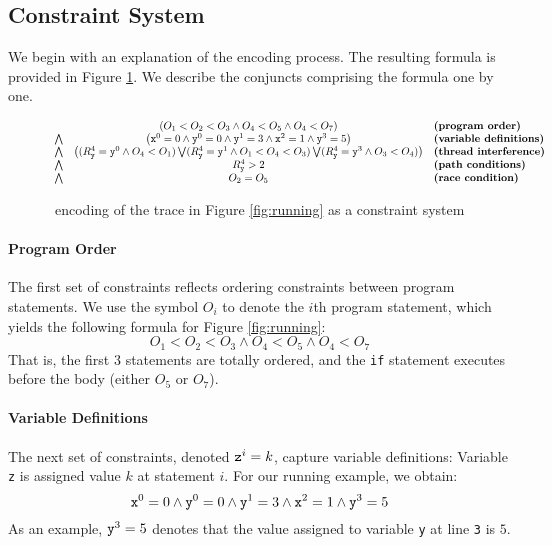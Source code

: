 \subsection{Constraint System}

We begin with an explanation of the encoding process. The resulting formula is provided in Figure \ref{fig:encoding}. We describe the conjuncts comprising the formula one by one.

\begin{figure*}
	\begin{center}
$$
	\begin{array}{rcl}
	& \left( O_1 < O_2 < O_3 \wedge O_4 < O_5 \wedge O_4 < O_7 \right) & \textbf{(program order)} \\
\bigwedge & \left( {\tt x}^0 = 0 \wedge {\tt y}^0 = 0 \wedge {\tt y}^1 = 3 \wedge 
	{\tt x}^2 = 1 \wedge {\tt y}^3 = 5 \right) & \textbf{(variable definitions)} \\
\bigwedge & \left(		(R_{\tt y}^4={\tt y}^0 \wedge O_4 < O_1) \bigvee	
(R_{\tt y}^4={\tt y}^1 \wedge O_1 < O_4 < O_3) \bigvee
(R_{\tt y}^4={\tt y}^3 \wedge O_3 < O_4)
		\right) & \textbf{(thread interference)} \\
\bigwedge & R_{\tt y}^4 > 2 & \textbf{(path conditions)} \\
\bigwedge & O_2 = O_5 & \textbf{(race condition)}
	\end{array} 
$$
\end{center}
\caption{\label{fig:encoding}\tool\ encoding of the trace in Figure \ref{fig:running} as a constraint system}
\end{figure*}

\paragraph{Program Order} The first set of constraints reflects ordering constraints between program statements. We use the symbol $O_i$ to denote the $i$th program statement, which yields the following formula for Figure \ref{fig:running}:
$$
	O_1 < O_2 < O_3 \wedge O_4 < O_5 \wedge O_4 < O_7
$$
That is, the first 3 statements are totally ordered, and the {\tt if} statement executes before the body (either $O_5$ or $O_7$).

\paragraph{Variable Definitions} The next set of constraints, denoted ${\tt z}^i=k$, capture variable definitions: Variable {\tt z} is assigned value $k$ at statement $i$. For our running example, we obtain:
$$
	{\tt x}^0 = 0 \wedge {\tt y}^0 = 0 \wedge {\tt y}^1 = 3 \wedge 
			{\tt x}^2 = 1 \wedge {\tt y}^3 = 5
$$
As an example, ${\tt y}^3 = 5$ denotes that the value assigned to variable {\tt y} 
at line {\tt 3} is $5$.

